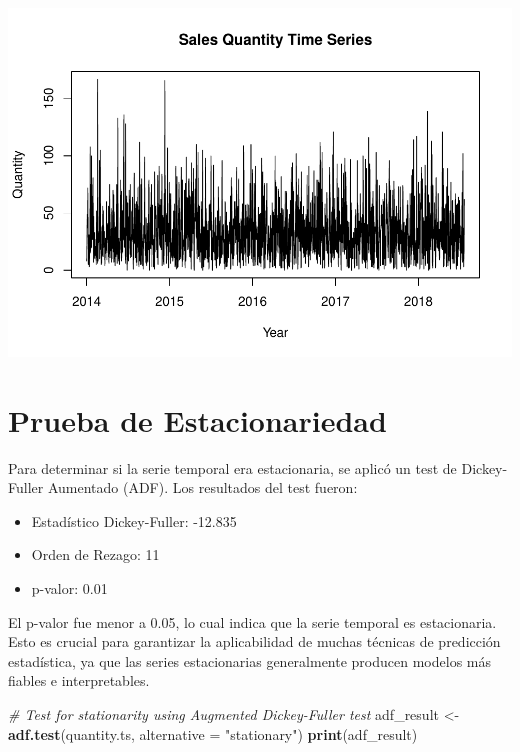 \documentclass[
]{book}
\newenvironment{Shaded}{\begin{snugshade}}{\end{snugshade}}
\newcommand{\AttributeTok}[1]{\textcolor[rgb]{0.13,0.29,0.53}{#1}}
\newcommand{\CommentTok}[1]{\textcolor[rgb]{0.56,0.35,0.01}{\textit{#1}}}
\newcommand{\FunctionTok}[1]{\textcolor[rgb]{0.13,0.29,0.53}{\textbf{#1}}}
\newcommand{\NormalTok}[1]{#1}
\newcommand{\OtherTok}[1]{\textcolor[rgb]{0.56,0.35,0.01}{#1}}
\newcommand{\StringTok}[1]{\textcolor[rgb]{0.31,0.60,0.02}{#1}}
\providecommand{\tightlist}{%
  \setlength{\itemsep}{0pt}\setlength{\parskip}{0pt}}
\begin{document}
\includegraphics{_main_files/figure-latex/unnamed-chunk-34-1.pdf}

\section{Prueba de Estacionariedad}\label{prueba-de-estacionariedad}

Para determinar si la serie temporal era estacionaria, se aplicó un test de Dickey-Fuller Aumentado (ADF). Los resultados del test fueron:

\begin{itemize}
\tightlist
\item
  Estadístico Dickey-Fuller: -12.835
\item
  Orden de Rezago: 11
\item
  p-valor: 0.01
\end{itemize}

El p-valor fue menor a 0.05, lo cual indica que la serie temporal es estacionaria. Esto es crucial para garantizar la aplicabilidad de muchas técnicas de predicción estadística, ya que las series estacionarias generalmente producen modelos más fiables e interpretables.

\begin{Shaded}
\begin{Highlighting}[]
\CommentTok{\# Test for stationarity using Augmented Dickey{-}Fuller test}
\NormalTok{adf\_result }\OtherTok{\textless{}{-}} \FunctionTok{adf.test}\NormalTok{(quantity.ts, }\AttributeTok{alternative =} \StringTok{"stationary"}\NormalTok{)}
\FunctionTok{print}\NormalTok{(adf\_result)}
\end{Highlighting}
\end{Shaded}
\end{document}
